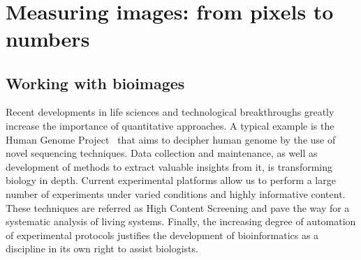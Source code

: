 


~\cite{lecuyer_global_2007} %
~\cite{Chen_2015} %
~\cite{lubeck_single_cell_2014} %
~\cite{eng_seqfish_2019} %




\section{Measuring images: from pixels to numbers}
\label{sec:computation_biology}

\subsection{Working with bioimages}
\label{subsec:intro_bioimages}

Recent developments in life sciences and technological breakthroughs greatly increase the importance of quantitative approaches.
A typical example is the Human Genome Project~\cite{lander_initial_2001} that aims to decipher human genome by the use of novel sequencing techniques.
Data collection and maintenance, as well as development of methods to extract valuable insights from it, is transforming biology in depth.
Current experimental platforms allow us to perform a large number of experiments under varied conditions and highly informative content.
These techniques are referred as High Content Screening and pave the way for a systematic analysis of living systems.
Finally, the increasing degree of automation of experimental protocols justifies the development of bioinformatics as a discipline in its own right to assist biologists.

